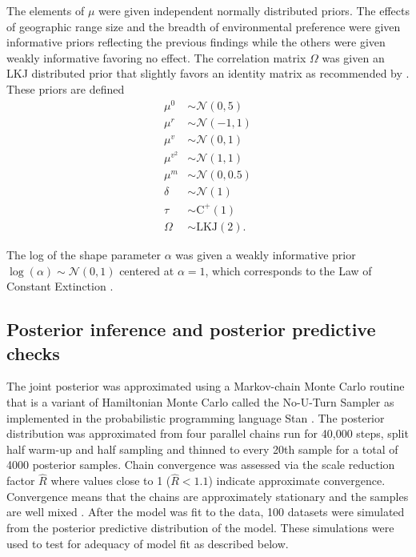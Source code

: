 \documentclass[11pt]{article}
\begin{document}
The elements of \(\mu\) were given independent normally distributed priors. The effects of geographic range size  and the breadth of environmental preference were given informative priors reflecting the previous findings while the others were given weakly informative favoring no effect. The correlation matrix \(\Omega\) was given an LKJ distributed prior \citep{Lewandowski2009} that slightly favors an identity matrix as recommended by \citet{stan-manual:2014}. These priors are defined
\begin{equation}
  \begin{aligned}
    \mu^{0} &\sim \mathcal{N}(0, 5) \\
    \mu^{r} &\sim \mathcal{N}(-1, 1) \\
    \mu^{v} &\sim \mathcal{N}(0, 1) \\
    \mu^{v^{2}} &\sim \mathcal{N}(1, 1) \\
    \mu^{m} &\sim \mathcal{N}(0, 0.5) \\
    \delta &\sim \mathcal{N}(1) \\
    \tau &\sim \mathrm{C^{+}}(1) \\
    \Omega &\sim \text{LKJ}(2).
  \end{aligned}
  \label{eq:sigma_prior}
\end{equation}

The log of the shape parameter \(\alpha\) was given a weakly informative prior \(\log(\alpha) \sim \mathcal{N}(0, 1)\) centered at \(\alpha = 1\), which corresponds to the Law of Constant Extinction \citep{VanValen1973}.


\subsection*{Posterior inference and posterior predictive checks}

The joint posterior was approximated using a Markov-chain Monte Carlo routine that is a variant of Hamiltonian Monte Carlo called the No-U-Turn Sampler \citep{Hoffman2014} as implemented in the probabilistic programming language Stan \citep{2014stan}. The posterior distribution was approximated from four parallel chains run for 40,000 steps, split half warm-up and half sampling and thinned to every 20th sample for a total of 4000 posterior samples. Chain convergence was assessed via the scale reduction factor \(\hat{R}\) where values close to 1 (\(\hat{R} < 1.1\)) indicate approximate convergence. Convergence means that the chains are approximately stationary and the samples are well mixed \citep{Gelman2013d}. After the model was fit to the data, 100 datasets were simulated from the posterior predictive distribution of the model. These simulations were used to test for adequacy of model fit as described below.
\end{document}
